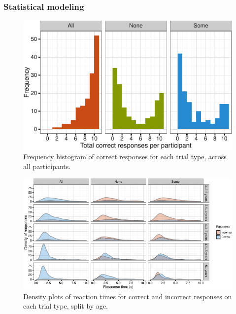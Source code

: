 \documentclass[10pt, letterpaper]{article}
\newenvironment{CodeChunk}{}{}
\begin{document}
\subsubsection{Statistical modeling}\label{statistical-modeling}

\begin{CodeChunk}
\begin{figure}[t]
\includegraphics{figs/diptest-1} \caption[Frequency histogram of correct responses for each trial type, across all participants]{Frequency histogram of correct responses for each trial type, across all participants.}\label{fig:diptest}
\end{figure}
\end{CodeChunk}

\begin{CodeChunk}
\begin{figure}[t]

{\centering \includegraphics{figs/dense-1} 

}

\caption[Density plots of reaction times for correct and incorrect responses on each trial type, split by age]{Density plots of reaction times for correct and incorrect responses on each trial type, split by age.}\label{fig:dense}
\end{figure}
\end{CodeChunk}
\end{document}
